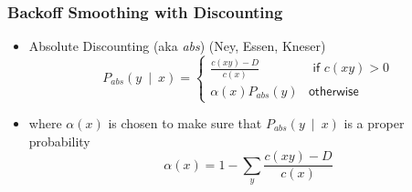 \begin{frame}
\frametitle{Backoff Smoothing with Discounting}
\begin{itemize}[<+->]
\item Absolute Discounting (aka \textit{abs}) (Ney, Essen, Kneser)
\[ P_{\textit{abs}}(y~\mid~x) = \left\{ 
\begin{array}{cc}
\frac{ c(xy) - D }{ c(x) } & \textsf{ if $c(xy) > 0$} \\
\alpha(x) P_{\textit{abs}} (y) & \textsf{otherwise}
\end{array}
\right. \]
\item where $\alpha(x)$ is chosen to make sure that $P_{\textit{abs}}(y~\mid~x)$ is a proper probability
\[ \alpha(x) = 1 - \sum_y \frac{ c(xy) - D }{ c(x) } \]
\end{itemize}
\end{frame}

